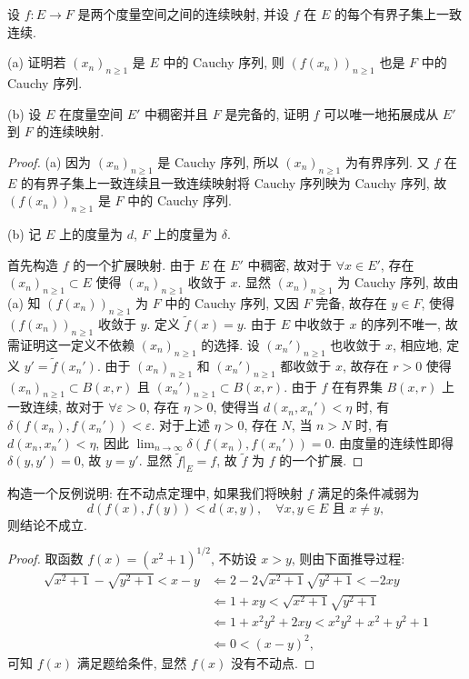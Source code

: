\begin{exercise}
    设 $f:E\to F$ 是两个度量空间之间的连续映射, 并设 $f$ 在 $E$ 的每个有界子集上一致连续.

    (a) 证明若 $(x_n)_{n\geq 1}$ 是 $E$ 中的 Cauchy 序列, 则 $(f(x_n))_{n\geq 1}$ 也是 $F$ 中的 Cauchy 序列.

    (b) 设 $E$ 在度量空间 $E'$ 中稠密并且 $F$ 是完备的, 证明 $f$ 可以唯一地拓展成从 $E'$ 到 $F$ 的连续映射.
\end{exercise}

\begin{proof}
    (a) 因为 $(x_n)_{n\geq 1}$ 是 Cauchy 序列, 所以 $(x_n)_{n\geq 1}$ 为有界序列.
    又 $f$ 在 $E$ 的有界子集上一致连续且一致连续映射将 Cauchy 序列映为 Cauchy 序列,
    故 $(f(x_n))_{n\geq 1}$ 是 $F$ 中的 Cauchy 序列.

    (b) 记 $E$ 上的度量为 $d$, $F$ 上的度量为 $\delta$.

    首先构造 $f$ 的一个扩展映射.
    由于 $E$ 在 $E'$ 中稠密, 故对于 $\forall x\in E'$,
    存在 $(x_n)_{n\geq 1}\subset E$ 使得 $(x_n)_{n\geq 1}$ 收敛于 $x$.
    显然 $(x_n)_{n\geq 1}$ 为 Cauchy 序列, 故由 (a) 知 $(f(x_n))_{n\geq 1}$
    为 $F$ 中的 Cauchy 序列, 又因 $F$ 完备, 故存在 $y\in F$,
    使得 $(f(x_n))_{n\geq 1}$ 收敛于 $y$. 定义 $\tilde{f}(x)=y$.
    由于 $E$ 中收敛于 $x$ 的序列不唯一, 故需证明这一定义不依赖 $(x_n)_{n\geq 1}$ 的选择.
    设 $(x_n')_{n\geq 1}$ 也收敛于 $x$, 相应地, 定义 $y'=\tilde{f}(x_n')$.
    由于 $(x_n)_{n\geq 1}$ 和 $(x_n')_{n\geq 1}$ 都收敛于 $x$,
    故存在 $r>0$ 使得 $(x_n)_{n\geq 1}\subset B(x,r)$ 且 $(x_n')_{n\geq 1}\subset B(x,r)$.
    由于 $f$ 在有界集 $B(x,r)$ 上一致连续,
    故对于 $\forall\varepsilon>0$, 存在 $\eta>0$, 使得当 $d(x_n,x_n')<\eta$ 时,
    有 $\delta(f(x_n),f(x_n'))<\varepsilon$.
    对于上述 $\eta>0$, 存在 $N$, 当 $n>N$ 时, 有 $d(x_n,x_n')<\eta$,
    因此 $\lim_{n\to\infty}\delta(f(x_n),f(x_n'))=0$.
    由度量的连续性即得 $\delta(y,y')=0$, 故 $y=y'$.
    显然 $\tilde{f}|_E=f$, 故 $\tilde{f}$ 为 $f$ 的一个扩展.
\end{proof}



\begin{exercise}
    构造一个反例说明: 在不动点定理中, 如果我们将映射 $f$ 满足的条件减弱为
    \[d(f(x),f(y))<d(x,y),\quad\forall x,y\in E\text{\ 且\ }x\neq y,\]
    则结论不成立.
\end{exercise}

\begin{proof}
    取函数 $f(x)=(x^2+1)^{1/2}$, 不妨设 $x>y$, 则由下面推导过程:
    \begin{align*}
        \sqrt{x^2+1}-\sqrt{y^2+1}<x-y
        &\Leftarrow 2-2\sqrt{x^2+1}\sqrt{y^2+1}<-2xy\\
        &\Leftarrow 1+xy<\sqrt{x^2+1}\sqrt{y^2+1}\\
        &\Leftarrow 1+x^2y^2+2xy<x^2y^2+x^2+y^2+1\\
        &\Leftarrow 0<(x-y)^2,
    \end{align*}
    可知 $f(x)$ 满足题给条件, 显然 $f(x)$ 没有不动点.
\end{proof}



